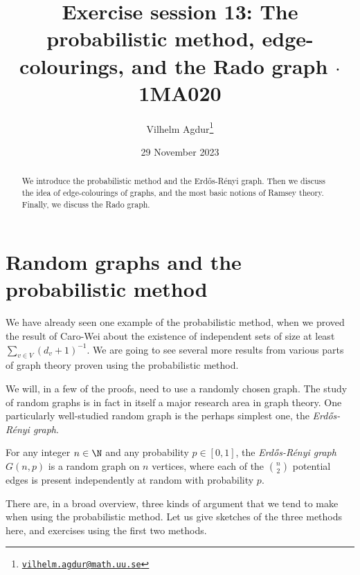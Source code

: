 \documentclass[nobib]{tufte-handout}
\title{Exercise session 13: The probabilistic method, edge-colourings, and the Rado graph $\cdot$ 1MA020}
\author[Vilhelm Agdur]{Vilhelm Agdur\thanks{\href{mailto:vilhelm.agdur@math.uu.se}{\nolinkurl{vilhelm.agdur@math.uu.se}}}}
\date{29 November 2023}
\begin{document}
\maketitle%

\begin{abstract}
\noindent
We introduce the probabilistic method and the Erd\H{o}s-Rényi graph. Then we discuss the idea of edge-colourings of graphs, and the most basic notions of Ramsey theory. Finally, we discuss the Rado graph.
\end{abstract}

\section{Random graphs and the probabilistic method}

We have already seen one example of the probabilistic method, when we proved the result of Caro-Wei about the existence of independent sets of size at least $\sum_{v\in V} (d_v + 1)^{-1}$. We are going to see several more results from various parts of graph theory proven using the probabilistic method.

We will, in a few of the proofs, need to use a randomly chosen graph. The study of random graphs is in fact in itself a major research area in graph theory. One particularly well-studied random graph is the perhaps simplest one, the \emph{Erd\H{o}s-Rényi graph}.

\begin{definition}
  For any integer $n \in \N$ and any probability $p \in [0,1]$, the \emph{Erd\H{o}s-Rényi graph} $G(n,p)$ is a random graph on $n$ vertices, where each of the $\binom{n}{2}$ potential edges is present independently at random with probability $p$.
\end{definition}

There are, in a broad overview, three kinds of argument that we tend to make when using the probabilistic method. Let us give sketches of the three methods here, and exercises using the first two methods.
\end{document}
